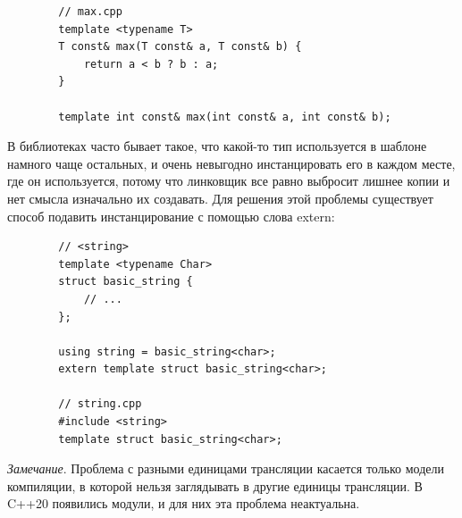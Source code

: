 \documentclass[12pt, a4paper]{article}
\begin{document}
	\begin{verbatim}
		// max.cpp
		template <typename T>
		T const& max(T const& a, T const& b) {
			return a < b ? b : a;
		}
		
		template int const& max(int const& a, int const& b);
	\end{verbatim}
	\par В библиотеках часто бывает такое, что какой-то тип используется в шаблоне намного чаще остальных, и очень невыгодно инстанцировать его в каждом месте, где он используется, потому что линковщик все равно выбросит лишнее копии и нет смысла изначально их создавать. Для решения этой проблемы существует способ подавить инстанцирование с помощью слова extern:
	\begin{verbatim}
		// <string>
		template <typename Char>
		struct basic_string {
			// ...
		};
		
		using string = basic_string<char>;
		extern template struct basic_string<char>;
		
		// string.cpp
		#include <string>
		template struct basic_string<char>;
	\end{verbatim}
	\textit{Замечание}. Проблема с разными единицами трансляции касается только модели компиляции, в которой нельзя заглядывать в другие единицы трансляции. В C++20 появились модули, и для них эта проблема неактуальна.
\end{document}
